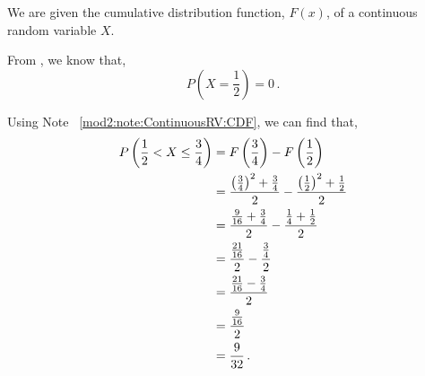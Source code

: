 %
%


\begin{subquestions}
	
\subquestion

We are given the cumulative distribution function, $F(x)$, of a continuous random variable $X$.
	
\begin{subsubquestions}
	
\subsubquestion

From , we know that,
\begin{equation}
	P\left(X= \frac{1}{2}\right) = 0 \,.
\end{equation}
	

\subsubquestion

Using Note ~\ref{mod2:note:ContinuousRV:CDF}, we can find that,
\begin{align}
	P\left(\frac{1}{2} < X \leq \frac{3}{4}\right) & = F\left(\frac{3}{4}\right) - F\left(\frac{1}{2}\right) \nonumber \\
	                                    & = \frac{\left(\frac{3}{4}\right)^2+\frac{3}{4}}{2} -   \frac{\left(\frac{1}{2}\right)^2+\frac{1}{2}}{2} \nonumber \\
	                                    & = \frac{\frac{9}{16}+\frac{3}{4}}{2} - \frac{\frac{1}{4}+\frac{1}{2}}{2} \nonumber \\
	                                    & = \frac{\frac{21}{16}}{2} - \frac{\frac{3}{4}}{2} \nonumber \\
	                                    & = \frac{\frac{21}{16} - \frac{3}{4}}{2} \nonumber \\
	                                    & = \frac{\frac{9}{16}}{2} \nonumber \\
	                                    & = \frac{9}{32} \,.
\end{align}


\end{subsubquestions}
\end{subquestions}
